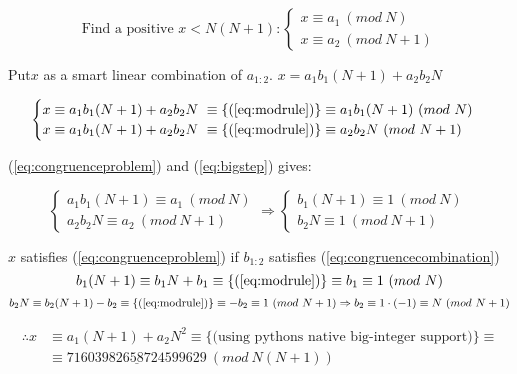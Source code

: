 \documentclass[a4paper,twoside=false,abstract=false,numbers=noenddot,
titlepage=false,headings=small,parskip=half,version=last]{scrartcl}
\begin{document}
\begin{equation} \label{eq:congruenceproblem}
    \text{Find a positive } x < N(N+1) : 
    \begin{cases}
        x \equiv a_{1}\ (mod\ N)\\
        x \equiv a_{2}\ (mod\ N+1)
    \end{cases}
\end{equation}

Put$x$ as a smart linear combination of $a_{1:2}$. 
$x=a_{1}b_{1}(N+1)+a_{2}b_{2}N$

\begin{equation} \label{eq:bigstep}
    \begin{cases}
        x \equiv a_{1}b_{1}(N+1)+a_{2}b_{2}N\ \equiv \{(\ref{eq:modrule})\} \equiv a_{1}b_{1}(N+1)\ (mod\ N)\\
        x \equiv a_{1}b_{1}(N+1)+a_{2}b_{2}N\ \equiv \{(\ref{eq:modrule})\} \equiv a_{2}b_{2}N\ (mod\ N+1)
    \end{cases}
\end{equation}

(\ref{eq:congruenceproblem}) and (\ref{eq:bigstep}) gives:

\begin{equation} \label{eq:congruencecombination}
    \begin{cases}
        a_{1}b_{1}(N+1) \equiv a_{1}\ (mod\ N)\\
        a_{2}b_{2}N \equiv a_{2}\ (mod\ N+1)
    \end{cases}
    \Rightarrow
    \begin{cases}
        b_{1}(N+1) \equiv 1\ (mod\ N)\\
        b_{2}N \equiv 1\ (mod\ N+1)
    \end{cases}
\ %
\end{equation}

$x$ satisfies (\ref{eq:congruenceproblem}) if $b_{1:2}$ satisfies (\ref{eq:congruencecombination})
\begin{equation*}
    b_{1}(N+1) \equiv b_{1}N+b_{1} \equiv \{(\ref{eq:modrule})\} \equiv b_{1} \equiv 1\ (mod\ N) 
\end{equation*}
\begin{equation*}
    b_{2}N \equiv b_{2}(N+1)-b_{2} \equiv \{(\ref{eq:modrule})\} \equiv -b_{2} \equiv 1\ (mod\ N+1)
    \Rightarrow
    b_{2} \equiv 1\cdot (-1) \equiv N\ (mod\ N+1)
\end{equation*}

\begin{equation*}
    \begin{split}
        \therefore x & \equiv a_{1}(N+1)+a_{2}N^{2} \equiv \{\text{(using pythons native big-integer support)}\} \equiv \\
        & \equiv \underline{71603982658724599629}\ (mod\ N(N+1))
    \end{split}
\end{equation*}
\end{document}
